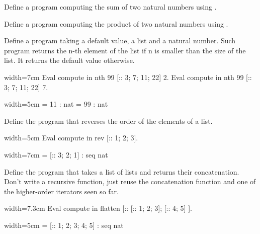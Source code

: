 \begin{Exercise}[label=ex:iteradd,difficulty=0,title={Addition with iteration}]
Define a program computing the sum of two natural numbers
using .
\end{Exercise}

\begin{Exercise}[label=ex:itermul,difficulty=0,title={Multiplication with iteration}]
Define a program computing the product of two natural numbers
using .
\end{Exercise}

\begin{Exercise}[label=ex:nth,difficulty=0,title={Find the n-th element}]
Define a program taking a default value, a list and  a natural number.  Such
program returns the n-th element of the list if n is smaller than the size of
the list.  It returns the default value otherwise.

\begin{coq}{}{width=7cm}
Eval compute in
  nth 99 [:: 3; 7; 11; 22] 2.
Eval compute in
  nth 99 [:: 3; 7; 11; 22] 7.
\end{coq}
\begin{coqout}{}{width=5cm}
     = 11
     : nat
     = 99
     : nat
\end{coqout}
\end{Exercise}

\begin{Exercise}[label=ex:rev,difficulty=0,title={List reversal}]
Define the program  that reverses the order of the elements
of a list.

\begin{coq}{}{width=5cm}
Eval compute in
  rev [:: 1; 2; 3].
\end{coq}
\begin{coqout}{}{width=7cm}
 = [:: 3; 2; 1]
 : seq nat
\end{coqout}
\end{Exercise}

\begin{Exercise}[label=ex:flatten,difficulty=1,title={List flattening}]
Define the program  that takes a list of lists and returns
their concatenation.  Don't write a recursive function, just reuse
the concatenation function and one of the higher-order iterators
seen so far.

\begin{coq}{}{width=7.3cm}
Eval compute in
  flatten [:: [:: 1; 2; 3]; [:: 4; 5] ].
\end{coq}
\begin{coqout}{}{width=5cm}
 = [:: 1; 2; 3; 4; 5]
 : seq nat
\end{coqout}
\end{Exercise}



